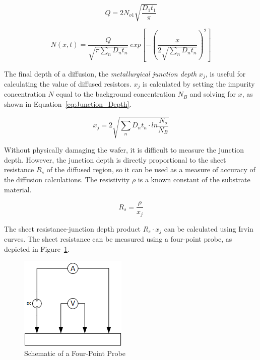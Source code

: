 \documentclass[letter,12pt]{article}
\begin{document}
			\begin{equation}			
				Q=2N_{o1}\sqrt{\frac{D_1t_1}{\pi}}
				\label{eq:Dose}	
			\end{equation}
		
			\begin{equation}			
				N(x,t) = \frac{Q}{\sqrt{\pi \sum\limits_{n} D_n t_n}}~exp\left[-\left(\frac{x}{2\sqrt{\sum\limits_{n} D_n t_n}}\right)^2\right]
				\label{eq:Limited_Source_Diff}	
			\end{equation}
			
			The final depth of a diffusion, the \textit{metallurgical junction depth} $x_j$, is useful for calculating the value of diffused resistors.  $x_j$ is calculated by setting the impurity concentration $N$ equal to the background concentration $N_B$ and solving for $x$, as shown in Equation~\ref{eq:Junction_Depth}.
			
			\begin{equation}				
				x_j=2 \sqrt{\sum\limits_{n} D_n t_n \cdot ln \frac{N_o}{N_B}}
				\label{eq:Junction_Depth}
			\end{equation}
			
			Without physically damaging the wafer, it is difficult to measure the junction depth.  However, the junction depth is directly proportional to the sheet resistance $R_s$ of the diffused region, so it can be used as a measure of accuracy of the diffusion calculations. The resistivity $\rho$ is a known constant of the substrate material. 
			
			\begin{equation}
				R_s = \frac{\rho}{x_j}
				\label{eq:Sheet_Resistance}
			\end{equation}
			
			The sheet resistance-junction depth product $R_s \cdot x_j$ can be calculated using Irvin curves. \cite{Jaeger_02}  The sheet resistance can be measured using a four-point probe, as depicted in Figure~\ref{fig:Four_Point_Probe}.
			
			\begin{figure}[h!]
				\centering
				\includegraphics[scale=1]{./Images/Four_Point_Probe.png}
				\caption{Schematic of a Four-Point Probe}
				\label{fig:Four_Point_Probe}
			\end{figure}
		
\end{document}
